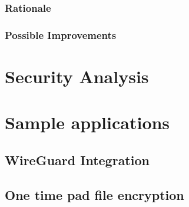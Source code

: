 \documentclass{paper}
\begin{document}
				\subsubsection{Rationale}
				\subsubsection{Possible Improvements}
					
				
		
		\section{Security Analysis}
		\section{Sample applications}
			\subsection{WireGuard Integration}
			\subsection{One time pad file encryption}
		
						
\end{document}
